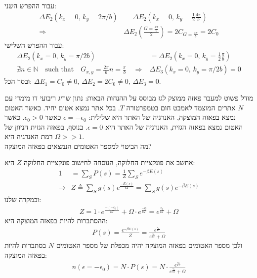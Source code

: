 \documentclass{article}
\begin{document}
\begin{Answer}
עבור ההפרש השני:
\begin{align*}
    \Delta E_{2}\left( k_{x}=0,\, k_{y}=2\pi/b \right)&=\Delta E_{2}\left( k_{x}=0,\, k_{y}=\frac{1}{2}\frac{4\pi}{b} \right)\\
    \Rightarrow &\Delta E_{2}\left( \frac{G=\frac{4\pi}{b}}{2} \right)=2C_{G=\frac{4\pi}{b}}=2C_{0}
\end{align*}
עבור ההפרש השלישי:
\begin{align*}
    \Delta E_{2}\left( k_{x}=0,\, k_{y}=\pi/2b \right)&=\Delta E_{2}\left( k_{x}=0,\, k_{y}=\frac{1}{2}\frac{\pi}{b} \right)\\
    \nexists n\in \mathbb{N}\quad \text{such that}\quad G_{x,y}=\frac{2\pi}{b}n=\frac{\pi}{b}\quad \Rightarrow &\Delta E_{3}\left( k_{x}=0,\, k_{y}=\pi/2b \right)=0
\end{align*}
ובסך הכל: ${\Delta E_{1}=C_{0}\neq0,\, \Delta E_{2}=2C_{0}\neq0,\, \Delta E_{3}=0}$.
\end{Answer}
\begin{Question}
מודל פשוט למעבר פאזה ממוצק לגז מבוסס על ההנחות הבאות: נתון שריג ריבועי דו מימדי עם $N$ אתרים המוצמד לאמבט חום בטמפרטורה $T$. בכל אתר נמצא אטום יחיד. כאשר האטום נמצא בפאזה המוצקה, האנרגיה של האתר היא שלילית: $\epsilon=-\epsilon_{0}$ כאשר $\epsilon_{0}>0$. כאשר האטום נמצא בפאזה הגזית, האנרגיה של האתר היא $\epsilon=0$. בנוסף, בפאזה הגזית הניוון של רמת האנרגיה היא $\Omega>>1$.\\
מה הביטוי למספר האטומים הנמצאים בפאזה המוצקה?
\end{Question}
\begin{Answer}
אחשב את פונקציית החלוקה,
הנוסחה לחישוב פונקציית החלוקה $Z$ היא:
\begin{align}\label{פונקציית החלוקה}
    1&=\sum \limits^{}_{S}{P\left( s \right)}=\frac{1}{Z}\sum \limits^{}_{S}{e^{-\beta E\left( s \right)}}\\
    \rightarrow&Z\triangleq \sum \limits^{}_{S}{g(s)e^{\frac{-E\left( s \right)}{kT} }}=\sum \limits^{}_{S}{g(s)e^{-\beta E\left( s \right)}}
\end{align}
ובמקרה שלנו:
\begin{align*}
    Z=1\cdot e^{\frac{-\left( -\epsilon_0 \right)}{kT}} + \Omega\cdot e^{\frac{-0}{kT}}=e^{\frac{\epsilon_0}{kT}}+\Omega
\end{align*}
ההסתברות להיות בפאזה המוצקה היא:
\begin{align*}
    P\left( s \right)=\frac{e^{-\beta E\left( s \right)}}{Z}=\frac{e^{\frac{\epsilon_0}{kT}}}{e^{\frac{\epsilon_0}{kT}}+\Omega}
\end{align*}
ולכן מספר האטומים בפאזה המוצקה יהיה מכפלת של מספר האטומים $N$ בסתברות להיות בפאזה המוצקה:
\begin{align*}
    n\left( \epsilon=-\epsilon_{0} \right)=N\cdot P\left( s \right)=N\cdot \frac{e^{\frac{\epsilon_0}{kT}}}{e^{\frac{\epsilon_0}{kT}}+\Omega}
\end{align*}
\end{Answer}
\end{document}
